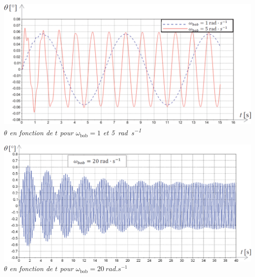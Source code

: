 \documentclass[10pt,fleqn]{article} %
\begin{document}
\begin{minipage}[c]{.48\linewidth}
\begin{center}
\includegraphics[width=\linewidth]{images/ccp_06}
\textit{$\theta$ en fonction de $t$  pour $\omega_{\text{bob}}= 1$ et \SI{5}{rad.s^{-1}}}
\end{center}

\begin{center}
\includegraphics[width=\linewidth]{images/ccp_07}
\textit{$\theta$ en fonction de $t$  pour $\omega_{\text{bob}}= \SI{20}{rad.s^{-1}}$}
\end{center}

\end{minipage} \hfill
\end{document}
